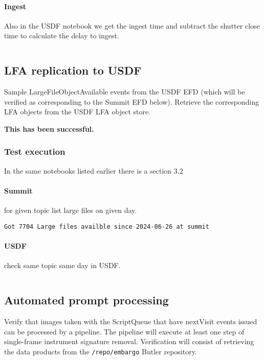 \begin{lstlisting}
\end{lstlisting}

\paragraph {Ingest} \label{sec:ingest}
Also in the USDF notebook we get the ingest time and subtract the shutter close time to calculate the
delay to ingest.
\begin{lstlisting}
\end{lstlisting}

\subsection{LFA replication to USDF }
Sample LargeFileObjectAvailable events from the USDF EFD (which will be verified as corresponding to the Summit EFD below).
Retrieve the corresponding LFA objects from the USDF LFA object store.

\textbf{This has been successful.}
\subsubsection{Test execution}
In the same notebooks  listed earlier there is a section 3.2

\paragraph{Summit} for given topic list large files on given day.
\begin{lstlisting}
Got 7704 Large files availble since 2024-06-26 at summit
\end{lstlisting}

\paragraph{USDF} check same topic same day in USDF.
\begin{lstlisting}
\end{lstlisting}

\subsection{Automated prompt processing}
Verify that images taken with the ScriptQueue that have nextVisit events issued can be processed by a pipeline.
The pipeline will execute at least one step of single-frame instrument signature removal.
Verification will consist of retrieving the data products from the \texttt{/repo/embargo} Butler repository.

